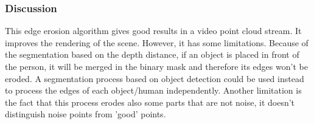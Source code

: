







\subsubsection{Discussion}

This edge erosion algorithm gives good results in a video point cloud stream. It improves the rendering of the scene. However, it has some limitations.  Because of the segmentation based on the depth distance, if an object is placed in front of the person, it will be merged in the binary mask and therefore its edges won't be eroded. A segmentation process based on object detection could be used instead to process the edges of each object/human independently. Another limitation is the fact that this process erodes also some parts that are not noise, it doesn't distinguish noise points from 'good' points.